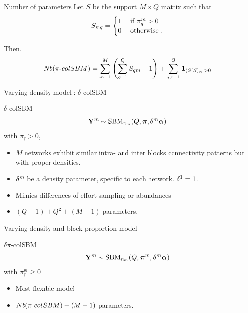 \documentclass[compress,10pt]{beamer}
\begin{document}
\begin{frame}{Number of parameters}
Let $S$ be the support   $M\times Q$ matrix such that 
\begin{equation*}\label{eq:support}
  S_{mq} = \begin{cases}
             1 & \text{ if } \pi^{m}_q>0 \\
             0 & \text{ otherwise }.
           \end{cases}
\end{equation*}

Then, 
\begin{equation*}\label{eq:Nbpi}
Nb(\pi\text{-} colSBM) = \sum_{m=1}^M \left(\sum_{q=1}^Q S_{qm}  -1\right)  + \sum_{q,r =1}^{Q} \mathbf{1}_{(S'S)_{qr}>0}
\end{equation*}


\end{frame}


\begin{frame}{Varying density model : $\delta$-colSBM}
 
 
 \begin{block}{ $\delta$-colSBM}
 \begin{equation*}
\mathbf{Y}^m \sim \mbox{SBM}_{n_m}(Q,\boldsymbol{\pi}, \delta^m\boldsymbol{\alpha})
\end{equation*}
with  $\pi_q>0$,
\end{block}

 
 
 \begin{itemize}
  \item $M$ networks 
exhibit similar intra- and inter blocks connectivity patterns but with proper densities. 
\item $\delta^m$ be a  density parameter, specific to each network. $\delta^1 = 1$. 
\item Mimics differences of effort sampling or abundances
\item $(Q - 1)+  Q^2 + (M-1)  $ parameters. 
\end{itemize}
\end{frame}


\begin{frame}{Varying density and block proportion model}

 \begin{block}{$ \delta\pi$-colSBM}
 \begin{equation*}
\mathbf{Y}^m \sim \mbox{SBM}_{n_m}(Q, \boldsymbol{\pi}^m, \delta^m\boldsymbol{\alpha})
\end{equation*}
with  $\pi^m_q\geq0$
 \end{block}

 \begin{itemize}
  \item Most flexible model
\item  $Nb(\pi\text{-} colSBM)  + (M-1)  $ parameters. 
\end{itemize}
\end{frame}
 
\end{document}
